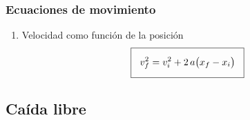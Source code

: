 \documentclass[14pt]{beamer}
\begin{document}
\begin{frame}
\frametitle{Ecuaciones de movimiento}
\begin{enumerate}[<+->]
\conti
\item Velocidad como función de la posición
\begin{align*}
\setlength{\fboxsep}{3\fboxsep}\boxed{
v_{f}^{2} = v_{i}^{2} + 2 \, a \big( x_{f} - x_{i}\big)
}
\end{align*}
\end{enumerate}
\end{frame}

\subsection{Caída libre}
\end{document}
